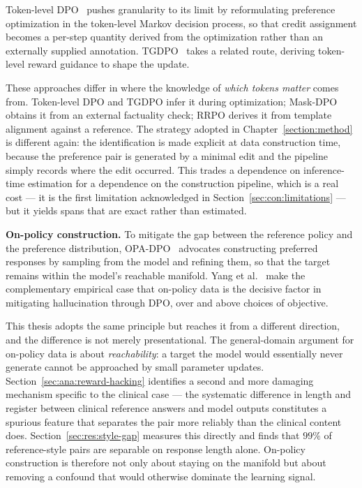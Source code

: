 Token-level DPO~\cite{zeng2024token} pushes granularity to its limit by reformulating preference optimization in the token-level Markov decision process, so that credit assignment becomes a per-step quantity derived from the optimization rather than an externally supplied annotation. TGDPO~\cite{zhu2025tgdpo} takes a related route, deriving token-level reward guidance to shape the update.

These approaches differ in where the knowledge of \emph{which tokens matter} comes from. Token-level DPO and TGDPO infer it during optimization; Mask-DPO obtains it from an external factuality check; RRPO derives it from template alignment against a reference. The strategy adopted in Chapter~\ref{section:method} is different again: the identification is made explicit at data construction time, because the preference pair is generated by a minimal edit and the pipeline simply records where the edit occurred. This trades a dependence on inference-time estimation for a dependence on the construction pipeline, which is a real cost --- it is the first limitation acknowledged in Section~\ref{sec:con:limitations} --- but it yields spans that are exact rather than estimated.

\textbf{On-policy construction.} To mitigate the gap between the reference policy and the preference distribution, OPA-DPO~\cite{yang2025opadpo} advocates constructing preferred responses by sampling from the model and refining them, so that the target remains within the model's reachable manifold. Yang et al.~\cite{yang2025mitigating} make the complementary empirical case that on-policy data is the decisive factor in mitigating hallucination through DPO, over and above choices of objective.

This thesis adopts the same principle but reaches it from a different direction, and the difference is not merely presentational. The general-domain argument for on-policy data is about \emph{reachability}: a target the model would essentially never generate cannot be approached by small parameter updates. Section~\ref{sec:ana:reward-hacking} identifies a second and more damaging mechanism specific to the clinical case --- the systematic difference in length and register between clinical reference answers and model outputs constitutes a spurious feature that separates the pair more reliably than the clinical content does. Section~\ref{sec:res:style-gap} measures this directly and finds that $99\%$ of reference-style pairs are separable on response length alone. On-policy construction is therefore not only about staying on the manifold but about removing a confound that would otherwise dominate the learning signal.

